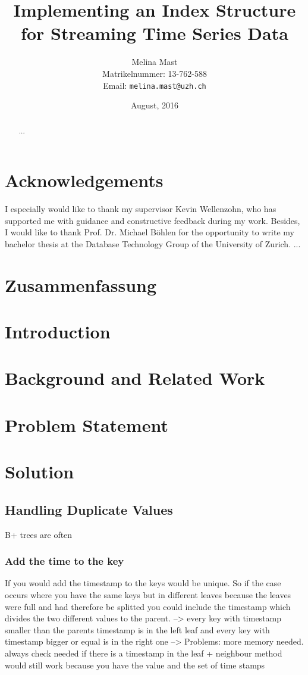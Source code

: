 \documentclass[abstracton,12pt]{scrreprt}
\title{Implementing an Index Structure for Streaming Time Series Data}
\author{
  Melina Mast\\[-5pt]
  \scriptsize Matrikelnummer: 13-762-588\\[-5pt]
  \scriptsize Email: \texttt{melina.mast@uzh.ch}
}
\date{\vspace*{2cm}August, 2016}
\begin{document}
\maketitle

\chapter*{Acknowledgements}

I especially would like to thank my supervisor Kevin Wellenzohn, who has supported me with guidance and constructive feedback during my work. Besides, I would like to thank Prof. Dr. Michael Böhlen for the opportunity to write my bachelor thesis at the Database Technology Group of the University of Zurich. ...   

\begin{abstract}
  ...
\end{abstract}

\chapter*{Zusammenfassung}

\tableofcontents
\listoffigures
\listoftables

\listofalgorithms
{}

\chapter{Introduction}
\chapter{Background and Related Work}
\chapter{Problem Statement}

\chapter{Solution}
\section{Handling Duplicate Values}

B+ trees are often 

\subsection{Add the time to the key}
If you would add the timestamp to the keys would be unique. So if the case occurs where you have the same keys but in different leaves because the leaves were full and had therefore be splitted you could include the timestamp which divides the two different values to the parent. --> every key with timestamp smaller than the parents timestamp is in the left leaf and every key with timestamp bigger or equal is in the right one --> 
Problems: more memory needed. always check needed if there is a timestamp in the leaf
+ neighbour method would still work because you have the value and the set of time stamps 
\end{document}
